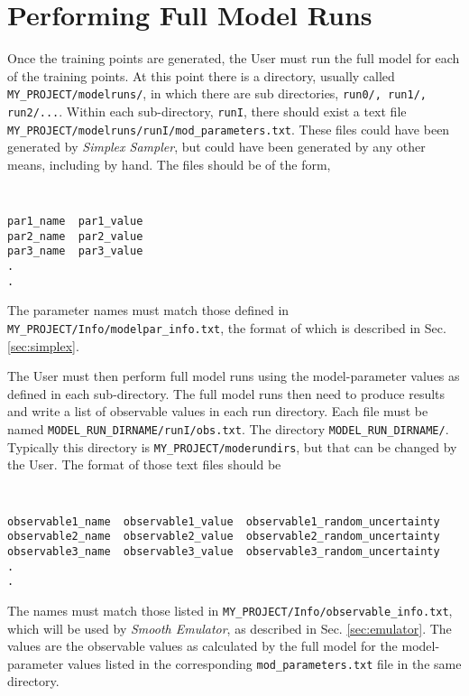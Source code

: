 \documentclass[UserManual.tex]{subfiles}
\begin{document}
\setcounter{section}{3}
\section{Performing Full Model Runs}\label{sec:fullmodel}

Once the training points are generated, the User must run the full model for each of the training points. At this point there is a directory, usually called {\tt MY\_PROJECT/modelruns/}, in which there are sub directories, {\tt run0/, run1/, run2/...}.  Within each sub-directory, {\tt runI}, there should exist a text file {\tt MY\_PROJECT/modelruns/runI/mod\_parameters.txt}. These files could have been generated by {\it Simplex Sampler}, but could have been generated by any other means, including by hand. The files should be of the form,
{\tt
\begin{verbatim}
par1_name  par1_value
par2_name  par2_value
par3_name  par3_value
.
.
\end{verbatim}
}
The parameter names must match those defined in {\tt MY\_PROJECT/Info/modelpar\_info.txt}, the format of which is described in Sec. \ref{sec:simplex}. 

The User must then perform full model runs using the model-parameter values as defined in each sub-directory. The full model runs then need to produce results and write a list of observable values in each run directory. Each file must be named {\tt MODEL\_RUN\_DIRNAME/runI/obs.txt}. The directory {\tt MODEL\_RUN\_DIRNAME/}. Typically this directory is {\tt MY\_PROJECT/moderundirs}, but that can be changed by the User. The format of those text files should be
{\tt
\begin{verbatim}
observable1_name  observable1_value  observable1_random_uncertainty
observable2_name  observable2_value  observable2_random_uncertainty
observable3_name  observable3_value  observable3_random_uncertainty
.
.
\end{verbatim}
}
The names must match those listed in {\tt MY\_PROJECT/Info/observable\_info.txt}, which will be used by {\it Smooth Emulator}, as described in Sec. \ref{sec:emulator}. The values are the observable values as calculated by the full model for the model-parameter values listed in the corresponding {\tt mod\_parameters.txt} file in the same directory.
\end{document}
